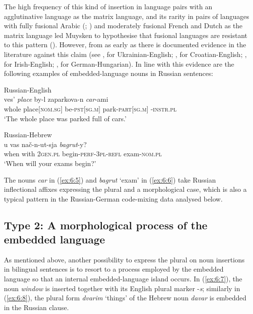 \noindent The high frequency of this kind of insertion in language pairs with an agglutinative language as the matrix language, and its rarity in pairs of languages with fully fusional Arabic (\citealt[180]{boumans-syntax-1998}; \citealt[189]{nortier90}) and moderately fusional French and Dutch as the matrix language \citep{treffers-daller-mixing-1994} led Muysken to hypothesise that fusional languages are resistant to this pattern (\citeyear[77]{muysken-bilingual-2000}). However, from as early as \cite[265--266]{hasselmo72} there is documented evidence in the literature against this claim (see \citealt[174]{budzhak-jones98}, for Ukrainian-English; \citealt[73]{hlavac-second-generation-2003}, for Croatian-English; \citealt[180]{stenson-1990}, for Irish-English; \citealt[352]{szabo-language-2010}, for German-Hungarian). In line with this evidence are the following examples of embedded-language nouns in Russian sentences:

\ea
\label{ex:6:5}
Russian-English \citep[173]{benson}\\
\gll ves' \textit{place} by-l zaparkova-n \textit{car}-ami\\
	whole place\([\)\textsc{nom.sg}\(]\) be-\textsc{pst}\([\)\textsc{sg.m}\(]\) park-\textsc{part\([\)sg.m\(]\)} \phantom{mn}-\textsc{instr.pl}\\
\glt `The whole place was parked full of cars.'
\z

\ea
\label{ex:6:6}
Russian-Hebrew \citep[48]{naiditch08}\\
 {u} {vas} {nač-n-ut-sja} \textit{bagrut}-y?\\
	when with \textsc{2gen.pl} begin-\textsc{perf-3pl-refl} exam-\textsc{nom.pl}\\
\glt `When will your exams begin?'
\z

\noindent The nouns \textit{car} in (\ref{ex:6:5}) and \textit{bagrut} `exam' in (\ref{ex:6:6}) take Russian inflectional affixes expressing the plural and a morphological case, which is also a typical pattern in the Russian-German code-mixing data analysed below.

\subsection{Type 2: A morphological process of the embedded language}

As mentioned above, another possibility to express the plural on noun insertions in bilingual sentences is to resort to a process employed by the embedded language so that an internal embedded-language island occurs. In (\ref{ex:6:7}), the noun \textit{window} is inserted together with its English plural marker -\textit{s}; similarly in (\ref{ex:6:8}), the plural form \textit{dvarim} `things' of the Hebrew noun \textit{davar} is embedded in the Russian clause.

